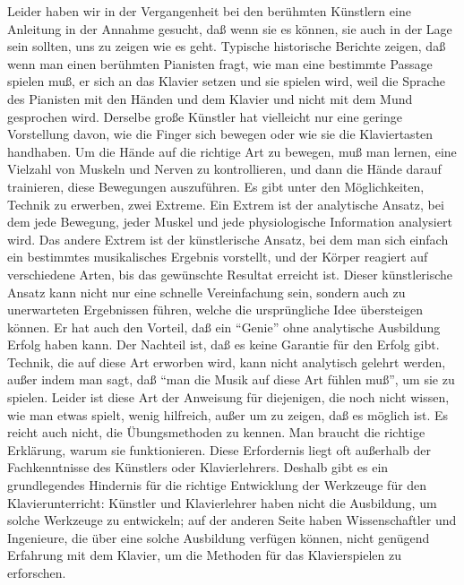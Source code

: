 Leider haben wir in der Vergangenheit bei den berühmten Künstlern eine Anleitung in der Annahme gesucht, daß wenn sie es können, sie auch in der Lage sein sollten, uns zu zeigen wie es geht.
Typische historische Berichte zeigen, daß wenn man einen berühmten Pianisten fragt, wie man eine bestimmte Passage spielen muß, er sich an das Klavier setzen und sie spielen wird, weil die Sprache des Pianisten mit den Händen und dem Klavier und nicht mit dem Mund gesprochen wird.
Derselbe große Künstler hat vielleicht nur eine geringe Vorstellung davon, wie die Finger sich bewegen oder wie sie die Klaviertasten handhaben.
Um die Hände auf die richtige Art zu bewegen, muß man lernen, eine Vielzahl von Muskeln und Nerven zu kontrollieren, und dann die Hände darauf trainieren, diese Bewegungen auszuführen.
Es gibt unter den Möglichkeiten, Technik zu erwerben, zwei Extreme.
Ein Extrem ist der analytische Ansatz, bei dem jede Bewegung, jeder Muskel und jede physiologische Information analysiert wird.
Das andere Extrem ist der künstlerische Ansatz, bei dem man sich einfach ein bestimmtes musikalisches Ergebnis vorstellt, und der Körper reagiert auf verschiedene Arten, bis das gewünschte Resultat erreicht ist.
Dieser künstlerische Ansatz kann nicht nur eine schnelle Vereinfachung sein, sondern auch zu unerwarteten Ergebnissen führen, welche die ursprüngliche Idee übersteigen können.
Er hat auch den Vorteil, daß ein \enquote{Genie} ohne analytische Ausbildung Erfolg haben kann.
Der Nachteil ist, daß es keine Garantie für den Erfolg gibt.
Technik, die auf diese Art erworben wird, kann nicht analytisch gelehrt werden, außer indem man sagt, daß \enquote{man die Musik auf diese Art fühlen muß}, um sie zu spielen.
Leider ist diese Art der Anweisung für diejenigen, die noch nicht wissen, wie man etwas spielt, wenig hilfreich, außer um zu zeigen, daß es möglich ist.
Es reicht auch nicht, die Übungsmethoden zu kennen.
Man braucht die richtige Erklärung, warum sie funktionieren.
Diese Erfordernis liegt oft außerhalb der Fachkenntnisse des Künstlers oder Klavierlehrers.
Deshalb gibt es ein grundlegendes Hindernis für die richtige Entwicklung der Werkzeuge für den Klavierunterricht: Künstler und Klavierlehrer haben nicht die Ausbildung, um solche Werkzeuge zu entwickeln; auf der anderen Seite haben Wissenschaftler und Ingenieure, die über eine solche Ausbildung verfügen können, nicht genügend Erfahrung mit dem Klavier, um die Methoden für das Klavierspielen zu erforschen.

